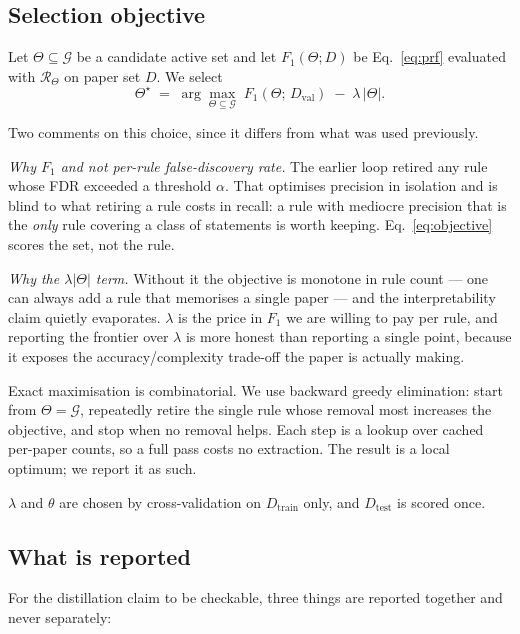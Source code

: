 \subsection{Selection objective}
\label{sec:objective}

Let $\Theta \subseteq \mathcal{G}$ be a candidate active set and let
$F_1(\Theta; D)$ be Eq.~\ref{eq:prf} evaluated with $\mathcal{R}_\Theta$ on
paper set $D$. We select
\begin{equation}
  \Theta^\star \;=\; \arg\max_{\Theta \subseteq \mathcal{G}}
    \; F_1(\Theta;\, D_{\mathrm{val}}) \;-\; \lambda \, |\Theta| .
  \label{eq:objective}
\end{equation}

Two comments on this choice, since it differs from what was used previously.

\emph{Why $F_1$ and not per-rule false-discovery rate.} The earlier loop retired
any rule whose FDR exceeded a threshold $\alpha$. That optimises precision in
isolation and is blind to what retiring a rule costs in recall: a rule with
mediocre precision that is the \emph{only} rule covering a class of statements is
worth keeping. Eq.~\ref{eq:objective} scores the set, not the rule.

\emph{Why the $\lambda|\Theta|$ term.} Without it the objective is monotone in
rule count --- one can always add a rule that memorises a single paper --- and
the interpretability claim quietly evaporates. $\lambda$ is the price in $F_1$ we
are willing to pay per rule, and reporting the frontier over $\lambda$ is more
honest than reporting a single point, because it exposes the accuracy/complexity
trade-off the paper is actually making.

Exact maximisation is combinatorial. We use backward greedy elimination: start
from $\Theta = \mathcal{G}$, repeatedly retire the single rule whose removal most
increases the objective, and stop when no removal helps. Each step is a lookup
over cached per-paper counts, so a full pass costs no extraction. The result is a
local optimum; we report it as such.

$\lambda$ and $\theta$ are chosen by cross-validation on
$D_{\mathrm{train}}$ only, and $D_{\mathrm{test}}$ is scored once.

\subsection{What is reported}
\label{sec:reporting}

For the distillation claim to be checkable, three things are reported together
and never separately:

